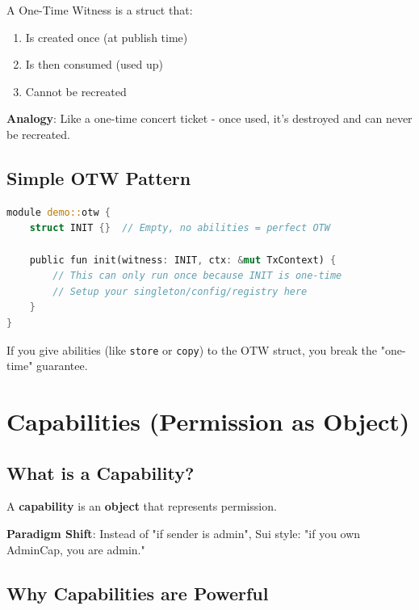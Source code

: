 \documentclass[11pt]{article}
\begin{document}
A One-Time Witness is a struct that:
\begin{enumerate}
  \item Is created once (at publish time)
  \item Is then consumed (used up)
  \item Cannot be recreated
\end{enumerate}

\begin{noteBox}
\textbf{Analogy}: Like a one-time concert ticket - once used, it's destroyed and can never be recreated.
\end{noteBox}

\subsection{Simple OTW Pattern}

\begin{lstlisting}[language=Rust]
module demo::otw {
    struct INIT {}  // Empty, no abilities = perfect OTW
    
    public fun init(witness: INIT, ctx: &mut TxContext) {
        // This can only run once because INIT is one-time
        // Setup your singleton/config/registry here
    }
}
\end{lstlisting}

\begin{warnBox}
If you give abilities (like \texttt{store} or \texttt{copy}) to the OTW struct, you break the "one-time" guarantee.
\end{warnBox}

\section{Capabilities (Permission as Object)}

\subsection{What is a Capability?}

A \textbf{capability} is an \textbf{object} that represents permission.

\begin{noteBox}
\textbf{Paradigm Shift}: Instead of "if sender is admin", Sui style: "if you own AdminCap, you are admin."
\end{noteBox}

\subsection{Why Capabilities are Powerful}
\end{document}
